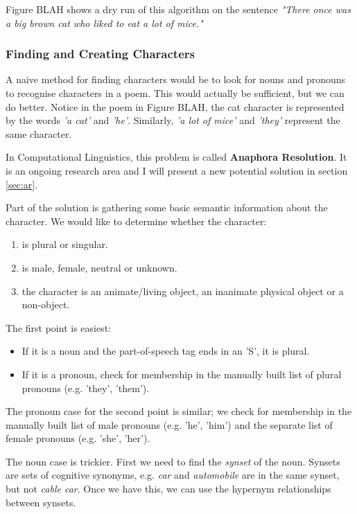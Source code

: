 Figure BLAH shows a dry run of this algorithm on the sentence \textit{"There once was a big brown cat who liked to eat a lot of mice."}

\subsubsection{Finding and Creating Characters}
\label{sec:characters} 

A naive method for finding characters would be to look for nouns and pronouns to recognise characters in a poem. This would actually be sufficient, but we can do better. Notice in the poem in Figure BLAH, the cat character is represented by the words \textit{'a cat'} and \textit{'he'}. Similarly, \textit{'a lot of mice'} and \textit{'they'} represent the same character.

In Computational Linguistics, this problem is called \textbf{Anaphora Resolution}. It is an ongoing research area and I will present a new potential solution in section \ref{sec:ar}.

Part of the solution is gathering some basic semantic information about the character. We would like to determine whether the character:

\begin{enumerate}
\item{is plural or singular.}
\item{is male, female, neutral or unknown.}
\item{the character is an animate/living object, an inanimate physical object or a non-object.}
\end{enumerate}

The first point is easiest:
\begin{itemize}
\item{If it is a noun and the part-of-speech tag ends in an 'S', it is plural.}
\item{If it is a pronoun, check for membership in the manually built list of plural pronouns (e.g. 'they', 'them').}
\end{itemize}

The pronoun case for the second point is similar; we check for membership in the manually built list of male pronouns (e.g. 'he', 'him') and the separate list of female pronouns (e.g. 'she', 'her'). 

The noun case is trickier. First we need to find the \textit{synset} of the noun. Synsets are sets of cognitive synonyms, e.g. \textit{car} and \textit{automobile} are in the same synset, but not \textit{cable car}. Once we have this, we can use the hypernym relationships between synsets.

